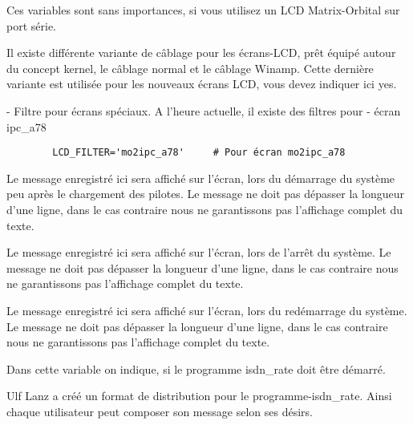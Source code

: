 \begin{description}
    Ces variables sont sans importances, si vous utilisez un LCD Matrix-Orbital
    sur port série.


Il existe différente variante de câblage pour les écrans-LCD, prêt équipé autour
du concept kernel, le câblage normal et le câblage Winamp. Cette dernière variante
est utilisée pour les nouveaux écrans LCD, vous devez indiquer ici yes.


- Filtre pour écrans spéciaux.
A l'heure actuelle, il existe des filtres pour
- écran ipc\_a78

\begin{example}
\begin{verbatim}
        LCD_FILTER='mo2ipc_a78'     # Pour écran mo2ipc_a78
\end{verbatim}
\end{example}


       Le message enregistré ici sera affiché sur l'écran, lors du démarrage du
       système peu après le chargement des pilotes. Le message ne doit pas dépasser
       la longueur d'une ligne, dans le cas contraire nous ne garantissons pas
       l'affichage complet du texte.


       Le message enregistré ici sera affiché sur l'écran, lors de l'arrêt du
       système. Le message ne doit pas dépasser la longueur d'une ligne, dans
       le cas contraire nous ne garantissons pas l'affichage complet du texte.


       Le message enregistré ici sera affiché sur l'écran, lors du redémarrage du
       système. Le message ne doit pas dépasser la longueur d'une ligne, dans le
       cas contraire nous ne garantissons pas l'affichage complet du texte.


      Dans cette variable on indique, si le programme isdn\_rate doit être démarré.


      Ulf Lanz a créé un format de distribution pour le programme-isdn\_rate.
      Ainsi chaque utilisateur peut composer son message selon ses désirs.


\end{description}
